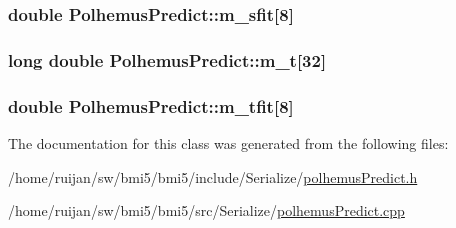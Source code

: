 \hypertarget{classPolhemusPredict_a73d63a68123ee20f3ae3f8fe578c080c}{
\subsubsection[{m\-\_\-sfit}]{\setlength{\rightskip}{0pt plus 5cm}double Polhemus\-Predict\-::m\-\_\-sfit\mbox{[}8\mbox{]}}}\label{classPolhemusPredict_a73d63a68123ee20f3ae3f8fe578c080c}
\hypertarget{classPolhemusPredict_a902d24baccdcc54ce03c6da3a0cc9e53}{
\subsubsection[{m\-\_\-t}]{\setlength{\rightskip}{0pt plus 5cm}long double Polhemus\-Predict\-::m\-\_\-t\mbox{[}32\mbox{]}}}\label{classPolhemusPredict_a902d24baccdcc54ce03c6da3a0cc9e53}
\hypertarget{classPolhemusPredict_ab5b8aa990488309d6b5920c8f244e375}{
\subsubsection[{m\-\_\-tfit}]{\setlength{\rightskip}{0pt plus 5cm}double Polhemus\-Predict\-::m\-\_\-tfit\mbox{[}8\mbox{]}}}\label{classPolhemusPredict_ab5b8aa990488309d6b5920c8f244e375}


The documentation for this class was generated from the following files\-:\begin{DoxyCompactItemize}
\item 
/home/ruijan/sw/bmi5/bmi5/include/\-Serialize/\hyperlink{polhemusPredict_8h}{polhemus\-Predict.\-h}\item 
/home/ruijan/sw/bmi5/bmi5/src/\-Serialize/\hyperlink{polhemusPredict_8cpp}{polhemus\-Predict.\-cpp}\end{DoxyCompactItemize}
